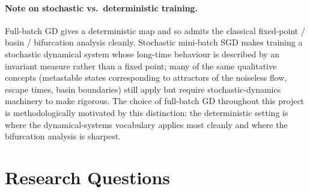 \documentclass[11pt,a4paper]{article}
\begin{document}
\paragraph{Note on stochastic vs.\ deterministic training.} Full-batch GD gives a deterministic map and so admits the classical fixed-point / basin / bifurcation analysis cleanly. Stochastic mini-batch SGD makes training a stochastic dynamical system whose long-time behaviour is described by an invariant measure rather than a fixed point; many of the same qualitative concepts (metastable states corresponding to attractors of the noiseless flow, escape times, basin boundaries) still apply but require stochastic-dynamics machinery to make rigorous. The choice of full-batch GD throughout this project is methodologically motivated by this distinction: the deterministic setting is where the dynamical-systems vocabulary applies most cleanly and where the bifurcation analysis is sharpest.

\section{Research Questions}
\end{document}
